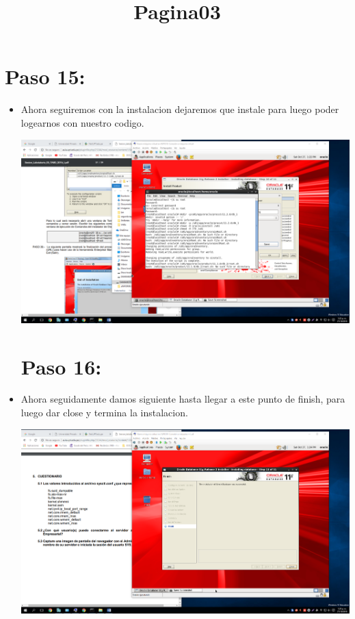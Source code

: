 \documentclass{article}
\title{Pagina03}
\begin{document}
\section{Paso 15:} 
\begin{itemize}
	\item Ahora seguiremos con la instalacion dejaremos que instale para luego poder logearnos con nuestro codigo.
	\begin{center}
	\includegraphics[width=14cm]{./Imagenes/imagen15} 
	\end{center}
	
\section{Paso 16:}
	\item Ahora seguidamente damos siguiente hasta llegar a este punto de finish, para luego dar close y termina la instalacion.
	\begin{center}
	\includegraphics[width=14cm]{./Imagenes/imagen16} 
	\end{center}
\newpage

\end{itemize}
\end{document}

